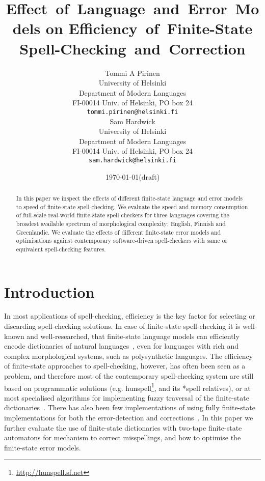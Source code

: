 \documentclass[11pt]{article}
\title{Effect~of~Language~and~Error~Models on Efficiency~of~Finite-State
Spell-Checking~and~Correction}
\author{
Tommi A Pirinen\\
University of Helsinki\\
Department of Modern Languages\\
FI-00014 Univ. of Helsinki, PO box 24\\
{\tt tommi.pirinen@helsinki.fi} \\\And
Sam Hardwick\\
University of Helsinki\\
Department of Modern Languages\\
FI-00014 Univ. of Helsinki, PO box 24\\
{\tt sam.hardwick@helsinki.fi} \\
}
\date{\today (draft)}
\begin{document}
\maketitle
\begin{abstract}
In this paper we inspect the effects of different finite-state language and
error models to speed of finite-state spell-checking. We evaluate the speed and
memory consumption of full-scale real-world finite-state spell checkers for
three languages covering the broadest available spectrum of morphological
complexity; English, Finnish and Greenlandic. We evaluate the effects of
different finite-state error models and optimisations against contemporary
software-driven spell-checkers with same or equivalent spell-checking features.
\end{abstract}

\section{Introduction}
\label{sec:introduction}

In most applications of spell-checking, efficiency is the key factor for
selecting or discarding spell-checking solutions. In case of finite-state
spell-checking it is well-known and well-researched, that finite-state language
models can efficiently encode dictionaries of natural
languages~\cite{beesley/2003}, even for languages with rich and complex
morphological systems, such as polysynthetic languages. The efficiency of
finite-state approaches to spell-checking, however, has often been seen as a
problem, and therefore most of the contemporary spell-checking system are still
based on programmatic solutions (e.g.
hunspell\footnote{\url{http://hunspell.sf.net}}, and its *spell relatives), or
at most specialised algorithms for implementing fuzzy traversal of the
finite-state dictionaries~\cite{oflazer/1996,hulden/2009}. There has also been
few implementations of using fully finite-state implementations for both the
error-detection and corrections~\cite{schulz/2002,pirinen/2010/lrec}. In this
paper we further evaluate the use of finite-state dictionaries with two-tape
finite-state automatons for mechanism to correct misspellings, and how to
optimise the finite-state error models. 
\end{document}
